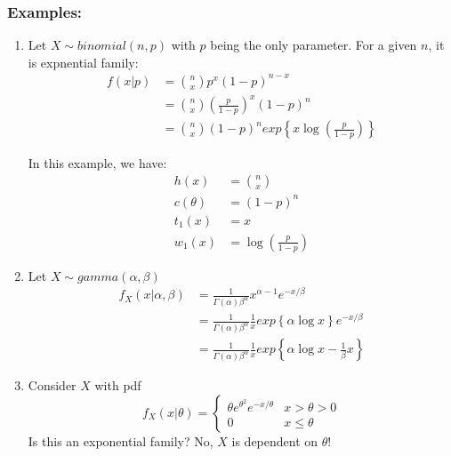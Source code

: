 \documentclass{article}
\begin{document}
\subsubsection{Examples:}
\begin{enumerate}
    \item Let $X \sim binomial(n,p)$ with $p$ being the only parameter. For a given $n$, it is expnential family:
    \begin{equation*}
    \begin{split}
        f(x|p) &= {n \choose x} p^x (1-p)^{n-x}\\
                &= {n \choose x}\left( \frac{p}{1-p}\right)^x (1-p)^n\\
                &= {n\choose x}(1-p)^n exp\left\{x\log \left(\frac{p}{1-p}\right) \right\}
    \end{split}
    \end{equation*}
    
    In this example, we have:
    \begin{equation*}
        \begin{split}
            h(x) &= {n \choose x}\\
            c(\theta) &= (1-p)^n\\
            t_1(x) &= x\\
            w_1(x) &= \log \left(\frac{p}{1-p} \right)
        \end{split}
    \end{equation*}
    
    \item Let $X\sim gamma(\alpha,\beta)$
    \begin{equation*}
    \begin{split}
        f_X(x|\alpha,\beta) &= \frac{1}{\Gamma(\alpha)\beta^\alpha} x^{\alpha-1} e^{-x/\beta}\\
        &= \frac{1}{\Gamma(\alpha)\beta^\alpha} \frac{1}{x} exp\left\{\alpha \log x\right\} e^{-x/\beta}\\
        &=\frac{1}{\Gamma(\alpha)\beta^\alpha} \frac{1}{x} exp\left\{\alpha \log x - \frac{1}{\beta}x \right\}
    \end{split}
    \end{equation*}
    
   \item Consider $X$ with pdf
   \begin{equation*}
        f_X(x|\theta) = 
       \begin{cases}
       \theta e^{\theta^2} e^{-x/\theta} & x > \theta > 0\\
       0 & x \leq \theta
       \end{cases}
   \end{equation*}
   Is this an exponential family? No, $X$ is dependent on $\theta$!
\end{enumerate}
\end{document}

